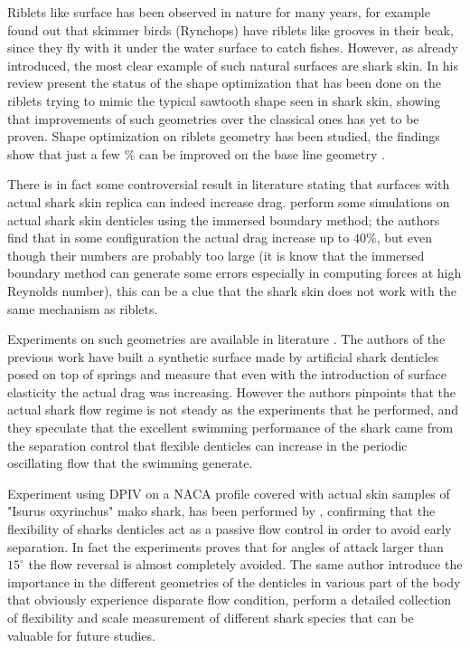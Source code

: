 Riblets like surface has been observed in nature for many years, for example \citet{Martin2016riblets} found out that skimmer birds (Rynchops) have riblets like grooves in their beak, since they fly with it under the water surface to catch fishes.
However, as already introduced, the most clear example of such natural surfaces are shark skin.
In his review \citet{dean2010shark} present the status of the shape optimization that has been done on the riblets trying to mimic the typical sawtooth shape seen in shark skin, showing that improvements of such geometries over the classical ones has yet to be proven.
Shape optimization on riblets geometry has been studied, the findings show that just a few $\%$ can be improved on the base line geometry \citet{bechert1997experiments}.

There is in fact some controversial result in literature stating that surfaces with actual shark skin replica can indeed increase drag.
\citet{boomsma2016direct} perform some simulations on actual shark skin denticles using the immersed boundary method; the authors find that in some configuration the actual drag increase up to $40\%$, but even though their numbers are probably too large (it is know that the immersed boundary method can generate some errors especially in computing forces at high Reynolds number), this can be a clue that the shark skin does not work with the same mechanism as riblets.

Experiments on such geometries are available in literature \citet{bechert1997natural}.
The authors of the previous work have built a synthetic surface made by artificial shark denticles posed on top of springs and measure that even with the introduction of  surface elasticity the actual drag was increasing.
However the authors pinpoints that the actual shark flow regime is not steady as the experiments that he performed, and they speculate that the excellent swimming performance of the shark came from the separation control that flexible denticles can increase in the periodic oscillating flow that the swimming generate.

Experiment using DPIV on a NACA profile covered with actual skin samples of "Isurus oxyrinchus" mako shark, has been performed by \citet{lang2014SharkControl}, confirming that the flexibility of sharks denticles act as a passive flow control in order to avoid early separation.
In fact the experiments proves that for angles of attack larger than $15^{\circ}$ the flow reversal is almost completely avoided.
The same author introduce the importance in the different geometries of the denticles in various part of the body that obviously experience disparate flow condition,
\citet{motta2012Shark} perform a detailed collection of flexibility and scale measurement of different shark species that can be valuable for future studies.

